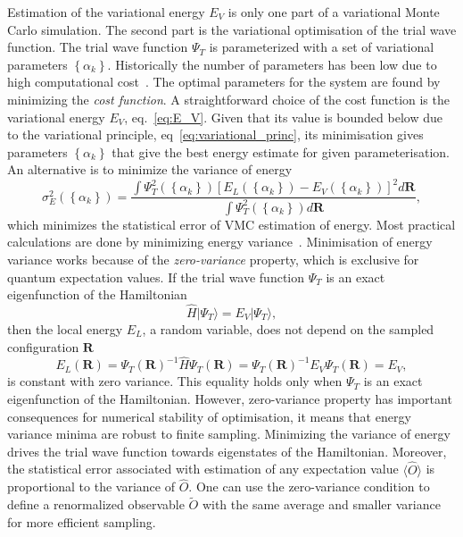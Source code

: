 Estimation of the variational energy $E_V$ is only one part of a variational Monte Carlo simulation. The second part is the variational optimisation of the trial wave function. The trial wave function $\Psi_T$ is parameterized with a set of variational parameters $\left\{\alpha_k\right\}$. Historically the number of parameters has been low due to high computational cost~\cite{foulkes2001quantum}. The optimal parameters for the system are found by minimizing the \emph{cost function}. A straightforward choice of the cost function is the variational energy $E_V$, eq.~\eqref{eq:E_V}. Given that its value is bounded below due to the variational principle, eq~\eqref{eq:variational_princ}, its minimisation gives parameters $\left\{\alpha_k\right\}$ that give the best energy estimate for given parameterisation. An alternative is to minimize the variance of energy
\begin{equation}
	\sigma_{E}^{2}(\left\{\alpha_k\right\})=\frac{\int \Psi_{T}^{2}(\left\{\alpha_k\right\})\left[E_{L}(\left\{\alpha_k\right\})-E_{V}(\left\{\alpha_k\right\})\right]^{2} d \mathbf{R}}{\int \Psi_{T}^{2}(\left\{\alpha_k\right\}) d \mathbf{R}},
\end{equation}	
which minimizes the statistical error of VMC estimation of energy. Most practical calculations are done by minimizing energy variance~\cite{foulkes2001quantum}. Minimisation of energy variance works because of the \emph{zero-variance} property, which is exclusive for quantum expectation values. If the trial wave function $\Psi_{T}$ is an exact eigenfunction of the Hamiltonian
\begin{equation}
	\hat H |\Psi_{T}\rangle = E_V |\Psi_{T}\rangle,
\end{equation}
then the local energy $E_L$, a random variable, does not depend on the sampled configuration $\mathbf{R}$ 
\begin{equation}				
	E_{L}(\mathbf{R})=\Psi_{T}(\mathbf{R})^{-1} \hat{H} \Psi_{T}(\mathbf{R}) = \Psi_{T}(\mathbf{R})^{-1} E_V \Psi_{T}(\mathbf{R}) = E_V,
\end{equation}
is constant with zero variance. This equality holds only when $\Psi_{T}$ is an exact eigenfunction of the Hamiltonian. However, zero-variance property has important consequences for numerical stability of optimisation, it means that energy variance minima are robust to finite sampling. Minimizing the variance of energy drives the trial wave function towards eigenstates of the Hamiltonian. Moreover, the statistical error associated with estimation of any expectation value $\langle \hat O \rangle$ is proportional to the variance of $\hat O$. One can use the zero-variance condition to define a renormalized observable $\tilde O$ with the same average and smaller variance~\cite{assaraf1999zero} for more efficient sampling. 

